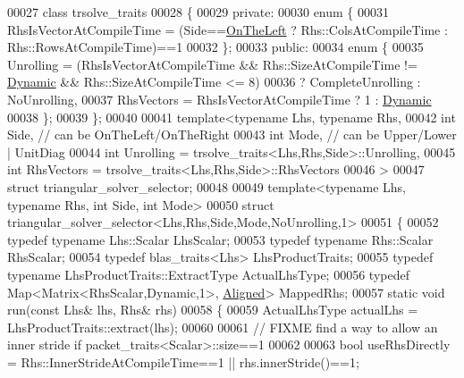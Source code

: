 \begin{DoxyCode}
00027 \textcolor{keyword}{class }trsolve\_traits
00028 \{
00029   \textcolor{keyword}{private}:
00030     \textcolor{keyword}{enum} \{
00031       RhsIsVectorAtCompileTime = (Side==\hyperlink{group__enums_ggac22de43beeac7a78b384f99bed5cee0ba129609b3bdf23b071f5f86cf2f995ec4}{OnTheLeft} ? Rhs::ColsAtCompileTime : 
      Rhs::RowsAtCompileTime)==1
00032     \};
00033   \textcolor{keyword}{public}:
00034     \textcolor{keyword}{enum} \{
00035       Unrolling   = (RhsIsVectorAtCompileTime && Rhs::SizeAtCompileTime != 
      \hyperlink{namespace_eigen_ad81fa7195215a0ce30017dfac309f0b2}{Dynamic} && Rhs::SizeAtCompileTime <= 8)
00036                   ? CompleteUnrolling : NoUnrolling,
00037       RhsVectors  = RhsIsVectorAtCompileTime ? 1 : \hyperlink{namespace_eigen_ad81fa7195215a0ce30017dfac309f0b2}{Dynamic}
00038     \};
00039 \};
00040 
00041 \textcolor{keyword}{template}<\textcolor{keyword}{typename} Lhs, \textcolor{keyword}{typename} Rhs,
00042   \textcolor{keywordtype}{int} Side, \textcolor{comment}{// can be OnTheLeft/OnTheRight}
00043   \textcolor{keywordtype}{int} Mode, \textcolor{comment}{// can be Upper/Lower | UnitDiag}
00044   \textcolor{keywordtype}{int} Unrolling = trsolve\_traits<Lhs,Rhs,Side>::Unrolling,
00045   \textcolor{keywordtype}{int} RhsVectors = trsolve\_traits<Lhs,Rhs,Side>::RhsVectors
00046   >
00047 \textcolor{keyword}{struct }triangular\_solver\_selector;
00048 
00049 \textcolor{keyword}{template}<\textcolor{keyword}{typename} Lhs, \textcolor{keyword}{typename} Rhs, \textcolor{keywordtype}{int} S\textcolor{keywordtype}{id}e, \textcolor{keywordtype}{int} Mode>
00050 \textcolor{keyword}{struct }triangular\_solver\_selector<Lhs,Rhs,Side,Mode,NoUnrolling,1>
00051 \{
00052   \textcolor{keyword}{typedef} \textcolor{keyword}{typename} Lhs::Scalar LhsScalar;
00053   \textcolor{keyword}{typedef} \textcolor{keyword}{typename} Rhs::Scalar RhsScalar;
00054   \textcolor{keyword}{typedef} blas\_traits<Lhs> LhsProductTraits;
00055   \textcolor{keyword}{typedef} \textcolor{keyword}{typename} LhsProductTraits::ExtractType ActualLhsType;
00056   \textcolor{keyword}{typedef} Map<Matrix<RhsScalar,Dynamic,1>, \hyperlink{group__enums_gga45fe06e29902b7a2773de05ba27b47a1ad37d4c71425bb286e9b4103830538fbf}{Aligned}> MappedRhs;
00057   \textcolor{keyword}{static} \textcolor{keywordtype}{void} run(\textcolor{keyword}{const} Lhs& lhs, Rhs& rhs)
00058   \{
00059     ActualLhsType actualLhs = LhsProductTraits::extract(lhs);
00060 
00061     \textcolor{comment}{// FIXME find a way to allow an inner stride if packet\_traits<Scalar>::size==1}
00062 
00063     \textcolor{keywordtype}{bool} useRhsDirectly = Rhs::InnerStrideAtCompileTime==1 || rhs.innerStride()==1;

\end{DoxyCode}
